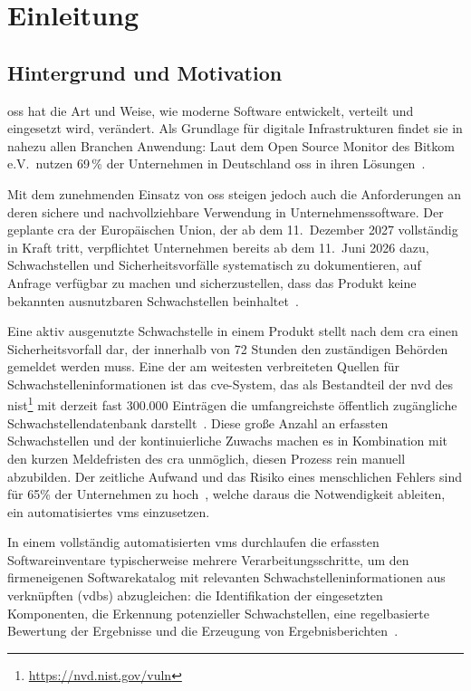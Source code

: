 \chapter{Einleitung}\label{ch:einleitung}


\section{Hintergrund und Motivation}\label{sec:hintergrund-motivation}

\acrfull{oss} hat die Art und Weise, wie moderne Software entwickelt, verteilt und eingesetzt wird, verändert.
Als Grundlage für digitale Infrastrukturen findet sie in nahezu allen Branchen Anwendung:
Laut dem Open Source Monitor des Bitkom e.V.\ nutzen 69\,\% der Unternehmen in Deutschland \acrshort{oss} in ihren Lösungen\ \autocite{OpenSourceMonitorWintergerst}.

Mit dem zunehmenden Einsatz von \acrshort{oss} steigen jedoch auch die Anforderungen an deren sichere und nachvollziehbare Verwendung in Unternehmenssoftware.
Der geplante \acrfull{cra} der Europäischen Union, der ab dem 11.\ Dezember 2027 vollständig in Kraft tritt,
verpflichtet Unternehmen bereits ab dem 11.\ Juni 2026 dazu, Schwachstellen und Sicherheitsvorfälle systematisch zu dokumentieren,
auf Anfrage verfügbar zu machen und sicherzustellen, dass das Produkt keine bekannten ausnutzbaren Schwachstellen beinhaltet\ \autocite{eu2024cra}.

Eine aktiv ausgenutzte Schwachstelle in einem Produkt stellt nach dem \acrshort{cra} einen Sicherheitsvorfall dar, der innerhalb von 72 Stunden den zuständigen Behörden gemeldet werden muss.
Eine der am weitesten verbreiteten Quellen für Schwachstelleninformationen ist das \acrfull{cve}-System, das als Bestandteil der \acrfull{nvd} des \acrfull{nist}\footnote{\url{https://nvd.nist.gov/vuln}} mit derzeit fast 300.000 Einträgen die umfangreichste öffentlich zugängliche Schwachstellendatenbank darstellt\ \autocite{nvd12mai2025dashboard}.
Diese große Anzahl an erfassten Schwachstellen und der kontinuierliche Zuwachs machen es in Kombination mit den kurzen Meldefristen des \acrshort{cra} unmöglich, diesen Prozess rein manuell abzubilden.
Der zeitliche Aufwand und das Risiko eines menschlichen Fehlers sind für 65\% der Unternehmen zu hoch\ \autocite{OpenSourceMonitorWintergerst}, welche daraus die Notwendigkeit ableiten, ein automatisiertes \acrfull{vms} einzusetzen.

In einem vollständig automatisierten \acrshort{vms} durchlaufen die erfassten Softwareinventare typischerweise mehrere Verarbeitungsschritte, um den firmeneigenen Softwarekatalog mit relevanten Schwachstelleninformationen aus verknüpften  (\acrshort{vdb}s) abzugleichen:
die Identifikation der eingesetzten Komponenten, die Erkennung potenzieller Schwachstellen, eine regelbasierte Bewertung der Ergebnisse und die Erzeugung von Ergebnisberichten\ \autocite{Idrissi_Sebai_Faroukhi_Mahouachi_2024}.

